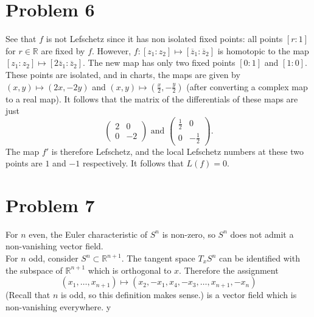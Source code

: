 \documentclass{amsart}
\numberwithin{equation}{section}
\theoremstyle{plain}
\theoremstyle{definition}
\theoremstyle{remark}
\renewcommand{\_}[2]{\underbrace{#1}_{#2}}
\renewcommand{\^}[2]{\overbrace{#1}_{#2}}
\newcommand{\R}{\mathbb{R}}
\begin{document}
\section*{Problem 6}
See that $f$ is not Lefschetz since it has non isolated fixed points: all points $[r:1]$ for $r\in \R$ are fixed by $f$. However, $f:[z_1:z_2] \mapsto [\overline z_1: \overline z_2]$ is homotopic to the map $[z_1:z_2] \mapsto [2\overline z_1: \overline z_2]$. The new map has only two fixed points $[0:1]$ and $[1:0]$. These points are isolated, and in charts, the maps are given by $(x,y) \mapsto (2x, -2y)$ and $(x,y) \mapsto (\frac x2,-\frac y2)$ (after converting a complex map to a real map). It follows that the matrix of the differentials of these maps are just \[
  \begin{pmatrix}
    2 & 0 \\ 0 & -2
  \end{pmatrix} \text{ and }
  \begin{pmatrix}
    \frac12 & 0 \\ 0 & -\frac12
  \end{pmatrix}.
\]
The map $f'$ is therefore Lefschetz, and the local Lefschetz numbers at these two points are $1$ and $-1$ respectively. It follows that $L(f) = 0$. 

\section*{Problem 7}
For $n$ even, the Euler characteristic of $S^n$ is non-zero, so $S^n$ does not admit a non-vanishing vector field.\\

For $n$ odd, consider $S^n \subset \R^{n+1}$. The tangent space $T_xS^n$ can be identified with the subspace of $\R^{n+1}$ which is orthogonal to $x$. Therefore the assignment \[(x_1, \dots, x_{n+1}) \mapsto (x_2, -x_1, x_4, -x_3, \dots, x_{n+1}, -x_n)\] (Recall that $n$ is odd, so this definition makes sense.) is a vector field which is non-vanishing everywhere. 
y
\end{document}
